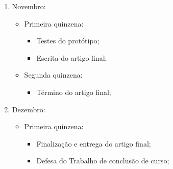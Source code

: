 \begin{enumerate}
\item Novembro:
  \begin{itemize}
    \item Primeira quinzena:
      \begin{itemize}
        \item Testes do protótipo;
        \item Escrita do artigo final;
      \end{itemize}
    \item Segunda quinzena:
      \begin{itemize}
        \item Término do artigo final;
      \end{itemize}
  \end{itemize}

\item Dezembro:
  \begin{itemize} 
    \item Primeira quinzena:
      \begin{itemize}
        \item Finalização e entrega do artigo final;
        \item Defesa do Trabalho de conclusão de curso;
      \end{itemize}
  \end{itemize}
\end{enumerate}
